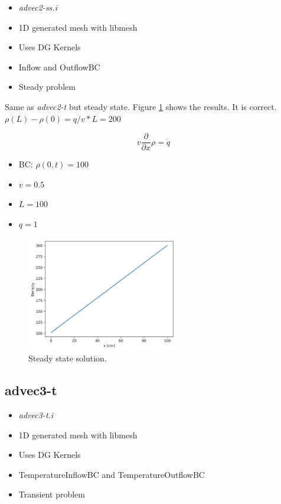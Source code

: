 \documentclass[11pt,letterpaper]{article}
\begin{document}
	\begin{itemize}
		\item \textit{advec2-ss.i}
		\item 1D generated mesh with libmesh
		\item Uses DG Kernels
		\item Inflow and OutflowBC
		\item Steady problem
	\end{itemize}

    Same as \textit{advec2-t} but steady state.
    Figure \ref{fig:advec2-ss} shows the results.
    It is correct. $\rho(L) - \rho(0) = q/v*L = 200$

	\begin{equation}
    v \frac{\partial}{\partial x} \rho = \dot{q}
	\end{equation}

	\begin{itemize}
		\item BC: $\rho(0, t) = 100$
		\item $v = 0.5$
		\item $L = 100$
		\item $q = 1$
	\end{itemize}

	\begin{figure}[htbp!]
		\centering
		\includegraphics[height=5cm]{advec2-ss}
		\caption{Steady state solution.}
		\label{fig:advec2-ss}
	\end{figure}

	\subsection{advec3-t}

	\begin{itemize}
		\item \textit{advec3-t.i}
		\item 1D generated mesh with libmesh
		\item Uses DG Kernels
		\item TemperatureInflowBC and TemperatureOutflowBC
		\item Transient problem
	\end{itemize}
\end{document}
